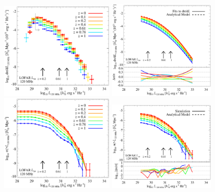 \documentclass[useAMS,usenatbib]{mn2e}
\begin{document}
\begin{figure} 
\centering
\includegraphics[width=0.5\textwidth,height=0.305\textheight]{figures/RLF_LOFAR.eps}
\includegraphics[width=0.47\textwidth,height=0.3\textheight]{figures/RLF_LOFAR_analytical_1.eps}
\includegraphics[width=0.5\textwidth,height=0.305\textheight]{figures/CumDensityL_LOFAR.eps}
\includegraphics[width=0.47\textwidth,height=0.3\textheight]{figures/CumDensityL_LOFAR_1.eps}

\end{figure}
\end{document}
